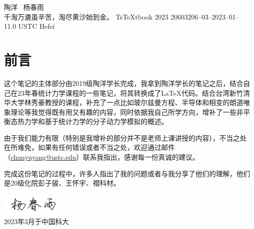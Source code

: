 \documentclass[AutoFakeBold]{tstextbook}
\begin{document}
{\large \kaishu 陶洋 \ 杨春雨\\
    千淘万漉虽辛苦，淘尽黄沙始到金。}
{Ts\TeX tbook}
{2023}
{20603}{206--03--2023--01--1}{1.0}
{USTC}
{Hefei}





\frontmatter
\chapter*{前言} %
\label{cha:前言}

这个笔记的主体部分由2019级陶洋学长完成，我拿到陶洋学长的笔记之后，结合自己在23年春统计力学课程的一些笔记，将其转换成了\LaTeX 代码。结合台湾新竹清华大学林秀豪教授的课程，补充了一点比如玻尔兹曼方程、半导体和相变的朗道唯象理论等我觉得既有用又有趣的内容，同时依据我自己所学方向，增补了一些非平衡态热力学和基于统计力学的分子动力学模拟的概述。

由于我们能力有限（特别是我增补的部分并不是老师上课讲授的内容），不当之处在所难免，如果有任何错误或者不当之处，欢迎通过邮件（\href{mailto:chunyuyang@ustc.edu}{chunyuyang@ustc.edu}）联系我指出，感谢每一份真诚的建议。

完成这份笔记的过程中，许多人指出了我的问题或者与我分享了他们的理解，他们是20级化院彭子骏、王怀宇、禤科材。



\begin{flushright}
    \includegraphics[width=0.24\textwidth]{images/signature.png}\\
    2023年3月于中国科大 
\end{flushright}



\mainmatter






\end{document}
